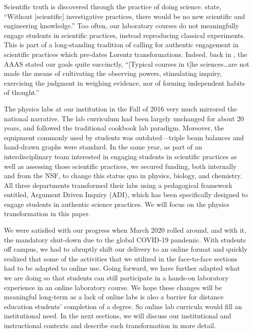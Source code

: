 \documentclass[aip, numerical, preprint]{revtex4-2}
\begin{document}
Scientific truth is discovered through the practice of doing science.  \citeauthor{DBERreport}
state, ``Without [scientific] investigative practices, there would be no new scientific and
engineering knowledge.''\citep{DBERreport} Too often, our laboratory courses do not
meaningfully engage students in scientific practices, instead reproducing classical
experiments.\citep{PCAST12} This is part of a long-standing tradition of calling for authentic
engagement in scientific practices which pre-dates Lorentz transformations.\citep{AAAS1881}
Indeed, back in \citeyear{AAAS1881}, the AAAS stated our goals quite succinctly, ``[Typical
courses in t]he sciences\ldots are not made the means of cultivating the observing powers,
stimulating inquiry, exercising the judgment in weighing evidence, nor of forming independent
habits of thought.''\citep{AAAS1881}

The physics labs at our institution in the Fall of 2016 very much mirrored the national
narrative.  The lab curriculum had been largely unchanged for about 20 years, and followed the
traditional cookbook lab paradigm.  Moreover, the equipment commonly used by students was
outdated---triple beam balances and hand-drawn graphs were standard.  In the same year, as part
of an interdisciplinary team interested in engaging students in scientific practices as well as
assessing those scientific practices, we secured funding, both internally and from the NSF, to
change this status quo in physics, biology, and chemistry.  All three departments transformed
their labs using a pedagogical framework entitled, Argument Driven Inquiry
(ADI),\citep{Sampson2011,Walker2011,Walker2016} which has been specifically designed to engage
students in authentic science practices. We will focus on the physics transformation in this
paper.

We were satisfied with our progress when March 2020 rolled around, and with it, the mandatory
shut-down due to the global COVID-19 pandemic.  With students off campus, we had to abruptly
shift our delivery to an online format and quickly realized that some of the activities that we
utilized in the face-to-face sections had to be adapted to online use.  Going forward, we have
further adapted what we are doing so that students can still participate in a hands-on
laboratory experience in an online laboratory course.  We hope these changes will be meaningful
long-term as a lack of online labs is also a barrier for distance education students'
completion of a degree.  So online lab curricula would fill an institutional need.  In the next
sections, we will discuss our institutional and instructional contexts and describe each
transformation in more detail.
\end{document}
